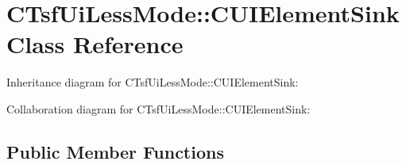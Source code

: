 \hypertarget{class_c_tsf_ui_less_mode_1_1_c_u_i_element_sink}{\section{C\+Tsf\+Ui\+Less\+Mode\+:\+:C\+U\+I\+Element\+Sink Class Reference}
\label{class_c_tsf_ui_less_mode_1_1_c_u_i_element_sink}
}


Inheritance diagram for C\+Tsf\+Ui\+Less\+Mode\+:\+:C\+U\+I\+Element\+Sink\+:


Collaboration diagram for C\+Tsf\+Ui\+Less\+Mode\+:\+:C\+U\+I\+Element\+Sink\+:
\subsection*{Public Member Functions}
